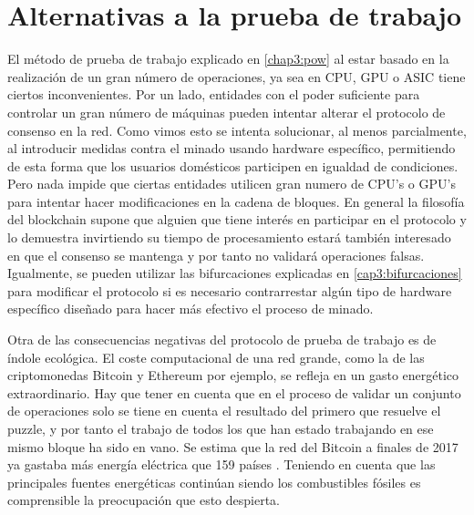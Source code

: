 \section{Alternativas a la prueba de trabajo}
El método de prueba de trabajo explicado en \ref{chap3:pow} al estar basado en la realización de un gran número de operaciones, ya sea en CPU, GPU o ASIC tiene ciertos inconvenientes. Por un lado, entidades con el poder suficiente para controlar un gran número de máquinas pueden intentar alterar el protocolo de consenso en la red. Como vimos esto se intenta solucionar, al menos parcialmente, al introducir medidas contra el minado usando hardware específico, permitiendo de esta forma que los usuarios domésticos participen en igualdad de condiciones. Pero nada impide que ciertas entidades utilicen gran numero de CPU's o GPU's para intentar hacer modificaciones en la cadena de bloques.
En general la filosofía del blockchain supone que alguien que tiene interés en participar en el protocolo y lo demuestra invirtiendo su tiempo de procesamiento estará también interesado en que el consenso se mantenga y por tanto no validará operaciones falsas. Igualmente, se pueden utilizar las bifurcaciones explicadas en \ref{cap3:bifurcaciones} para modificar el protocolo si es necesario contrarrestar algún tipo de hardware específico diseñado para hacer más efectivo el proceso de minado.

Otra de las consecuencias negativas del protocolo de prueba de trabajo es de índole ecológica. El coste computacional de una red grande, como la de las criptomonedas Bitcoin y Ethereum por ejemplo, se refleja en un gasto energético extraordinario. Hay que tener en cuenta que en el proceso de validar un conjunto de operaciones solo se tiene en cuenta el resultado del primero que resuelve el puzzle, y por tanto el trabajo de todos los que han estado trabajando en ese mismo bloque ha sido en vano. Se estima que la red del Bitcoin a finales de 2017 ya gastaba más energía eléctrica que 159 países \citep{electricidad}. Teniendo en cuenta que las principales fuentes energéticas continúan siendo los combustibles fósiles es comprensible la preocupación que esto despierta.

